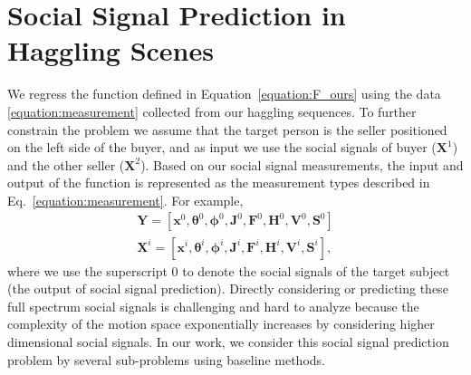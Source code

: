 
\section{Social Signal Prediction in Haggling Scenes}
We regress the function defined in Equation~\ref{equation:F_ours} using the data \ref{equation:measurement} collected from our haggling sequences. To further constrain the problem we assume that the target person is the seller positioned on the left side of the buyer, and as input we use the social signals of buyer ($\mathbf{X}^1$) and the other seller ($\mathbf{X}^2$). Based on our social signal measurements, the input and output of the function is represented as the measurement types described in Eq.~\ref{equation:measurement}. For example,
\begin{equation}
\begin{gathered}
\mathbf{Y} = [ \mathbf{x}^0, \boldsymbol{\theta}^0, \boldsymbol{\phi}^0, \mathbf{J}^0, \mathbf{F}^0, \mathbf{H}^0, \mathbf{V}^0, \mathbf{S}^0 ]\\
\mathbf{X}^i = [ \mathbf{x}^i, \boldsymbol{\theta}^i, \boldsymbol{\phi}^i, \mathbf{J}^i, \mathbf{F}^i, \mathbf{H}^i, \mathbf{V}^i, \mathbf{S}^i ],
\end{gathered}
\end{equation}
where we use the superscript 0 to denote the social signals of the target subject (the output of social signal prediction). Directly considering or predicting these full spectrum social signals is challenging and hard to analyze because the complexity of the motion space exponentially increases by considering higher dimensional social signals.  In our work, we consider this social signal prediction problem by several sub-problems using baseline methods. 


